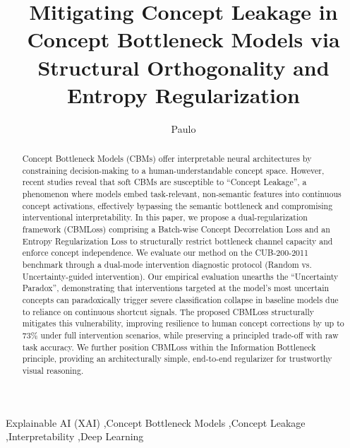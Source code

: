 \documentclass[times,twocolumn,final]{elsarticle}
\newif\ifanonymous
\begin{document}

\begin{frontmatter}

\title{Mitigating Concept Leakage in Concept Bottleneck Models via Structural Orthogonality and Entropy Regularization}

\ifanonymous
  \author[1]{XXXXXX}
  \emailauthor{XXXXXX}{XXXXXX}
  \address[1]{XXXXXX}
\else
  \author[1]{Paulo }
      
  \address[1]{Instituto Federal de Mato Grosso (IFMT), Brazil}
\fi

\received{\today}

\begin{abstract}
Concept Bottleneck Models (CBMs) offer interpretable neural architectures by constraining decision-making to a human-understandable concept space. However, recent studies reveal that soft CBMs are susceptible to ``Concept Leakage'', a phenomenon where models embed task-relevant, non-semantic features into continuous concept activations, effectively bypassing the semantic bottleneck and compromising interventional interpretability. In this paper, we propose a dual-regularization framework (CBMLoss) comprising a Batch-wise Concept Decorrelation Loss and an Entropy Regularization Loss to structurally restrict bottleneck channel capacity and enforce concept independence. We evaluate our method on the CUB-200-2011 benchmark through a dual-mode intervention diagnostic protocol (Random vs. Uncertainty-guided intervention). Our empirical evaluation unearths the ``Uncertainty Paradox'', demonstrating that interventions targeted at the model's most uncertain concepts can paradoxically trigger severe classification collapse in baseline models due to reliance on continuous shortcut signals. The proposed CBMLoss structurally mitigates this vulnerability, improving resilience to human concept corrections by up to 73\% under full intervention scenarios, while preserving a principled trade-off with raw task accuracy. We further position CBMLoss within the Information Bottleneck principle, providing an architecturally simple, end-to-end regularizer for trustworthy visual reasoning.
\end{abstract}

\begin{keyword}
Explainable AI (XAI) \sep Concept Bottleneck Models \sep Concept Leakage \sep Interpretability \sep Deep Learning
\end{keyword}

\end{frontmatter}
\end{document}
